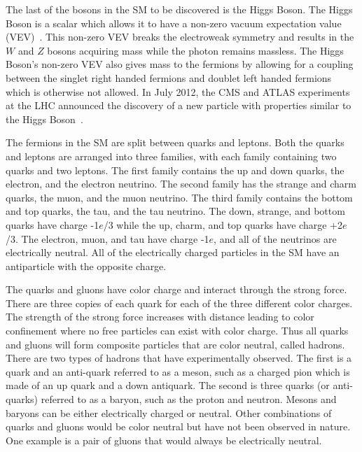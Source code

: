 The last of the bosons in the SM to be discovered is the Higgs Boson. The Higgs Boson is a scalar which allows it to have a non-zero vacuum expectation value 
(VEV)~\cite{PhysRevLett.13.508, PhysRevLett.13.321}.
This non-zero VEV breaks the electroweak symmetry and results in the $W$ and $Z$ bosons acquiring mass while the photon remains massless.
The Higgs Boson's non-zero VEV also gives mass to the fermions by allowing for a coupling between the singlet right handed fermions and doublet left handed fermions
which is otherwise not allowed.
In July 2012, the CMS and ATLAS experiments at the LHC
announced the discovery of a new particle with properties similar to the Higgs Boson~\cite{Chatrchyan:2012ufa, Aad:2012tfa}.

The fermions in the SM are split between quarks and leptons. Both the quarks and leptons are arranged into three families,
with each family containing two quarks and two leptons. 
The first family contains the up and down quarks, the electron, and the electron neutrino.
The second family has the strange and charm quarks, the muon, and the muon neutrino. The third family contains the bottom and top quarks,
the tau, and the tau neutrino. The down, strange, and bottom quarks have charge -1$e$/3 while the up, charm, and top quarks have charge +2$e$/3.
The electron, muon, and tau have charge -1$e$, and all of the neutrinos are electrically neutral. All of the electrically charged particles in the SM have
an antiparticle with the opposite charge.


The quarks and gluons have color charge and interact through the strong force. There are three copies of each quark for each of the three different color charges.
The strength of the strong force increases with distance leading to color confinement where no free particles can exist with color charge.
Thus all quarks and gluons will form composite particles that are color neutral, called hadrons. There are two types of hadrons that have experimentally observed.
The first is a quark and an anti-quark referred to as a meson, such as a charged pion which is made of an up quark and a down antiquark.
The second is three quarks (or anti-quarks) referred to as a baryon, such as the proton and neutron.
Mesons and baryons can be either electrically charged or neutral.
Other combinations of quarks and gluons would be color neutral but have not been observed in nature.
One example is a pair of gluons that would always be electrically neutral.


